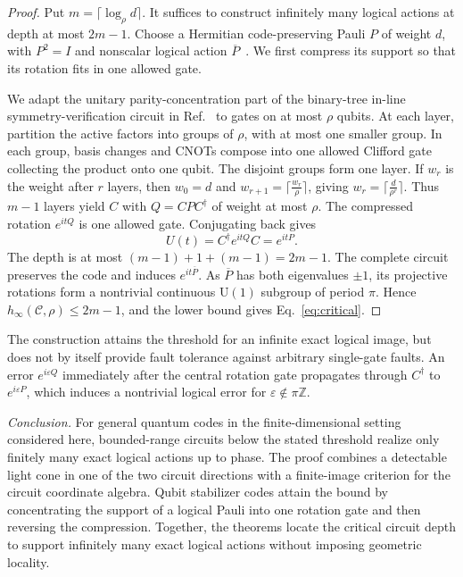 \documentclass[aps,prl,reprint,notitlepage,nofootinbib,nobibnotes]{revtex4-2}
\newcommand{\id}{I}
\begin{document}
\begin{proof}
Put \(m=\lceil\log_\rho d\rceil\). It suffices to construct infinitely many
logical actions at depth at most \(2m-1\).
Choose a Hermitian code-preserving Pauli \(P\) of weight \(d\), with
\(P^2=\id\) and nonscalar logical action
\(\overline P\)~\cite[Sec.~3.2]{GottesmanStabilizer}.
We first compress its support so that its rotation fits in one allowed
gate.

We adapt the unitary parity-concentration part of the binary-tree
in-line symmetry-verification circuit in
Ref.~\cite[Sec.~IV and Fig.~2(a)]{BonetMonroig}
to gates on at most \(\rho\) qubits.
At each layer, partition the active factors into groups of \(\rho\),
with at most one smaller group. In each group, basis changes and CNOTs
compose into one allowed Clifford gate collecting the product onto
one qubit. The disjoint groups form one layer.
If \(w_r\) is the weight after \(r\) layers, then
\(w_0=d\) and \(w_{r+1}=\lceil\frac{w_r}{\rho}\rceil\), giving
\(w_r=\lceil\frac{d}{\rho^r}\rceil\).
Thus \(m-1\) layers yield \(C\) with \(Q=CPC^\dagger\) of weight at
most \(\rho\). 
The compressed rotation \(e^{itQ}\) is one allowed gate.
Conjugating back gives
\begin{equation}\label{eq:pauli-family}
 U(t)=C^\dagger e^{itQ}C=e^{itP}.
\end{equation}
The depth is at most \((m-1)+1+(m-1)=2m-1\).
The complete circuit preserves the code and induces
\(e^{it\overline P}\). As \(\overline P\) has both eigenvalues
\(\pm1\), its projective rotations form a nontrivial continuous
\(\mathrm U(1)\) subgroup of period \(\pi\).
Hence \(h_\infty(\mathcal C,\rho)\le2m-1\), and the lower bound gives
Eq.~\eqref{eq:critical}.
\end{proof}
The construction attains the threshold for an infinite exact logical image,
but does not by itself provide fault tolerance against arbitrary single-gate faults.
An error \(e^{i\varepsilon Q}\) immediately after the central rotation gate
propagates through \(C^\dagger\) to \(e^{i\varepsilon P}\), which induces
a nontrivial logical error for \(\varepsilon\notin\pi\mathbb Z\).

\textit{Conclusion.}
For general quantum codes in the finite-dimensional setting considered
here, bounded-range circuits below the stated threshold realize only
finitely many exact logical actions up to phase. The proof combines a
detectable light cone in one of the two circuit directions with a
finite-image criterion for the circuit coordinate algebra.
Qubit stabilizer codes attain the bound by concentrating the support
of a logical Pauli into one rotation gate and then reversing the
compression. Together, the theorems locate the critical circuit depth to support
infinitely many exact logical actions without imposing geometric
locality.
\end{document}
